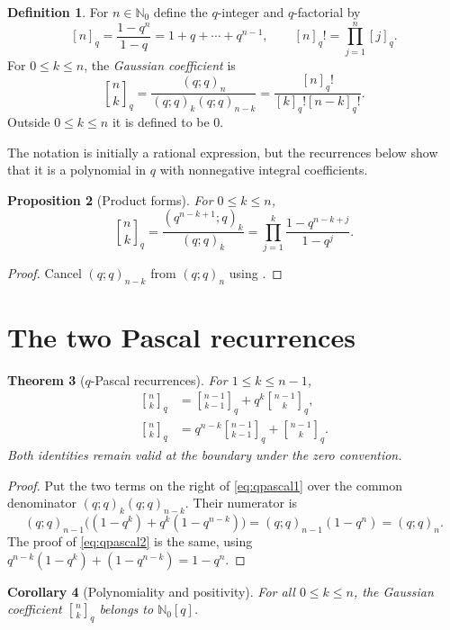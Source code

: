 \documentclass[11pt,oneside,openany]{book}
\newtheorem{theorem}{Theorem}[chapter]
\newtheorem{proposition}[theorem]{Proposition}
\newtheorem{corollary}[theorem]{Corollary}
\theoremstyle{definition}
\newtheorem{definition}[theorem]{Definition}
\theoremstyle{remark}
\newcommand{\qbinom}[2]{\genfrac{[}{]}{0pt}{}{#1}{#2}_{q}}
\newcommand{\N}{\mathbb N}
\begin{document}
\begin{definition}
For $n\in\N_0$ define the $q$-integer and $q$-factorial by
\[
 [n]_q=\frac{1-q^n}{1-q}=1+q+\cdots+q^{n-1},
 \qquad
 [n]_q!=\prod_{j=1}^{n}[j]_q.
\]
For $0\le k\le n$, the \emph{Gaussian coefficient} is
\[
 \qbinom nk
 =\frac{(q;q)_n}{(q;q)_k(q;q)_{n-k}}
 =\frac{[n]_q!}{[k]_q![n-k]_q!}.
\]
Outside $0\le k\le n$ it is defined to be $0$.
\end{definition}

The notation is initially a rational expression, but the recurrences below show that it is a polynomial in $q$ with nonnegative integral coefficients.

\begin{proposition}[Product forms]\label{prop:qbinom-products}
For $0\le k\le n$,
\[
 \qbinom nk
 =\frac{(q^{n-k+1};q)_k}{(q;q)_k}
 =\prod_{j=1}^{k}\frac{1-q^{n-k+j}}{1-q^j}.
\]
\end{proposition}

\begin{proof}
Cancel $(q;q)_{n-k}$ from $(q;q)_n$ using .
\end{proof}

\section{The two Pascal recurrences}

\begin{theorem}[$q$-Pascal recurrences]\label{thm:qpascal}
For $1\le k\le n-1$,
\begin{align}
 \qbinom nk&=\qbinom{n-1}{k-1}+q^k\qbinom{n-1}{k},\label{eq:qpascal1}\\
 \qbinom nk&=q^{n-k}\qbinom{n-1}{k-1}+\qbinom{n-1}{k}.\label{eq:qpascal2}
\end{align}
Both identities remain valid at the boundary under the zero convention.
\end{theorem}

\begin{proof}
Put the two terms on the right of \eqref{eq:qpascal1} over the common denominator $(q;q)_k(q;q)_{n-k}$.  Their numerator is
\[
 (q;q)_{n-1}\bigl((1-q^k)+q^k(1-q^{n-k})\bigr)
 =(q;q)_{n-1}(1-q^n)=(q;q)_n.
\]
The proof of \eqref{eq:qpascal2} is the same, using
\(
 q^{n-k}(1-q^k)+(1-q^{n-k})=1-q^n.
\)
\end{proof}

\begin{corollary}[Polynomiality and positivity]\label{cor:positivity}
For all $0\le k\le n$, the Gaussian coefficient $\qbinom nk$ belongs to $\N_0[q]$.
\end{corollary}
\end{document}
